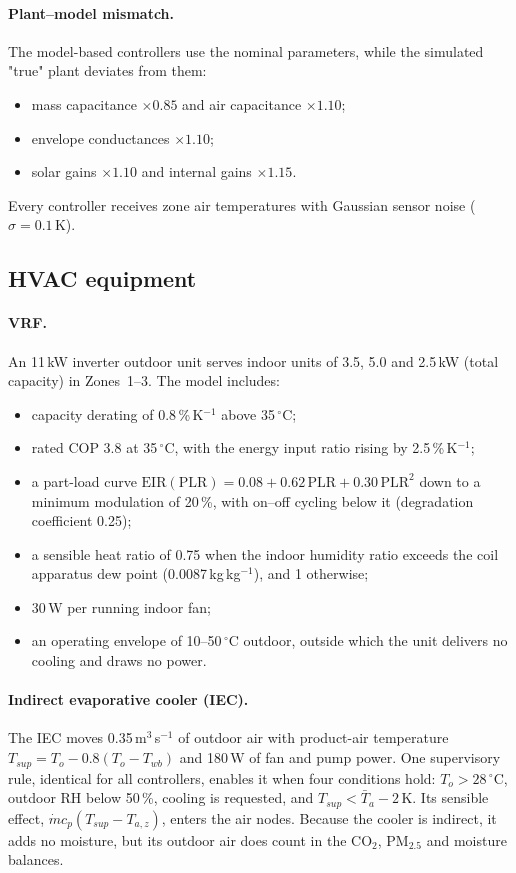 \paragraph{Plant--model mismatch.}
The model-based controllers use the nominal parameters, while the simulated "true"
plant deviates from them:
\begin{itemize}
  \item mass capacitance $\times0.85$ and air capacitance $\times1.10$;
  \item envelope conductances $\times1.10$;
  \item solar gains $\times1.10$ and internal gains $\times1.15$.
\end{itemize}
Every controller receives zone air temperatures with Gaussian sensor noise
($\sigma=0.1$\,K).

\subsection{HVAC equipment}
\paragraph{VRF.}
An 11\,kW inverter outdoor unit serves indoor units of 3.5, 5.0 and 2.5\,kW (total
capacity) in Zones~1--3. The model includes:
\begin{itemize}
  \item capacity derating of 0.8\,\%\,K$^{-1}$ above 35\,$^\circ$C;
  \item rated COP 3.8 at 35\,$^\circ$C, with the energy input ratio rising by
        2.5\,\%\,K$^{-1}$;
  \item a part-load curve
        $\mathrm{EIR}(\mathrm{PLR})=0.08+0.62\,\mathrm{PLR}+0.30\,\mathrm{PLR}^2$ down to
        a minimum modulation of 20\,\%, with on--off cycling below it (degradation
        coefficient 0.25);
  \item a sensible heat ratio of 0.75 when the indoor humidity ratio exceeds the coil
        apparatus dew point (0.0087\,kg\,kg$^{-1}$), and 1 otherwise;
  \item 30\,W per running indoor fan;
  \item an operating envelope of 10--50\,$^\circ$C outdoor, outside which the unit
        delivers no cooling and draws no power.
\end{itemize}

\paragraph{Indirect evaporative cooler (IEC).}
The IEC moves 0.35\,m$^3$\,s$^{-1}$ of outdoor air with product-air temperature
$T_{sup}=T_o-0.8(T_o-T_{wb})$ and 180\,W of fan and pump power. One supervisory rule,
identical for all controllers, enables it when four conditions hold: $T_o>28\,^\circ$C,
outdoor RH below 50\,\%, cooling is requested, and
$T_{sup}<\bar T_a-2$\,K. Its sensible effect,
$\dot m c_p (T_{sup}-T_{a,z})$, enters the air nodes. Because the cooler is indirect,
it adds no moisture, but its outdoor air does count in the CO$_2$, PM$_{2.5}$ and
moisture balances.

